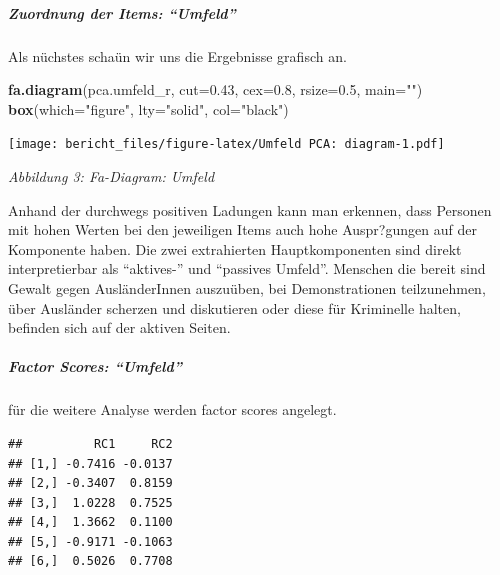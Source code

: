 \documentclass[]{article}
\newenvironment{Shaded}{\begin{snugshade}}{\end{snugshade}}
\newcommand{\KeywordTok}[1]{\textcolor[rgb]{0.13,0.29,0.53}{\textbf{{#1}}}}
\newcommand{\DataTypeTok}[1]{\textcolor[rgb]{0.13,0.29,0.53}{{#1}}}
\newcommand{\DecValTok}[1]{\textcolor[rgb]{0.00,0.00,0.81}{{#1}}}
\newcommand{\FloatTok}[1]{\textcolor[rgb]{0.00,0.00,0.81}{{#1}}}
\newcommand{\StringTok}[1]{\textcolor[rgb]{0.31,0.60,0.02}{{#1}}}
\newcommand{\NormalTok}[1]{{#1}}
\let\oldsubparagraph\subparagraph
\renewcommand{\subparagraph}[1]{\oldsubparagraph{#1}\mbox{}}
\begin{document}
\subparagraph{\texorpdfstring{Zuordnung der Items:
``Umfeld''}{Zuordnung der Items: Umfeld}}\label{zuordnung-der-items-umfeld}

Als nüchstes schaün wir uns die Ergebnisse grafisch an.

\begin{Shaded}
\begin{Highlighting}[]
\KeywordTok{fa.diagram}\NormalTok{(pca.umfeld_r, }\DataTypeTok{cut=}\FloatTok{0.43}\NormalTok{, }\DataTypeTok{cex=}\FloatTok{0.8}\NormalTok{, }\DataTypeTok{rsize=}\FloatTok{0.5}\NormalTok{, }\DataTypeTok{main=}\StringTok{""}\NormalTok{)}
\KeywordTok{box}\NormalTok{(}\DataTypeTok{which=}\StringTok{"figure"}\NormalTok{, }\DataTypeTok{lty=}\StringTok{"solid"}\NormalTok{, }\DataTypeTok{col=}\StringTok{"black"}\NormalTok{)}
\end{Highlighting}
\end{Shaded}

\texttt{[image: bericht\_files/figure-latex/Umfeld PCA: diagram-1.pdf]}

\begin{center}
\textit{Abbildung 3: Fa-Diagram: Umfeld}
\bigskip
\end{center}

Anhand der durchwegs positiven Ladungen kann man erkennen, dass Personen
mit hohen Werten bei den jeweiligen Items auch hohe Auspr?gungen auf der
Komponente haben. Die zwei extrahierten Hauptkomponenten sind direkt
interpretierbar als ``aktives-'' und ``passives Umfeld''. Menschen die
bereit sind Gewalt gegen AusländerInnen auszuüben, bei Demonstrationen
teilzunehmen, über Ausländer scherzen und diskutieren oder diese für
Kriminelle halten, befinden sich auf der aktiven Seiten.

\subparagraph{\texorpdfstring{Factor Scores:
``Umfeld''}{Factor Scores: Umfeld}}\label{factor-scores-umfeld}

für die weitere Analyse werden factor scores angelegt.

\begin{Shaded}
\end{Shaded}

\begin{verbatim}
##          RC1     RC2
## [1,] -0.7416 -0.0137
## [2,] -0.3407  0.8159
## [3,]  1.0228  0.7525
## [4,]  1.3662  0.1100
## [5,] -0.9171 -0.1063
## [6,]  0.5026  0.7708
\end{verbatim}
\end{document}
